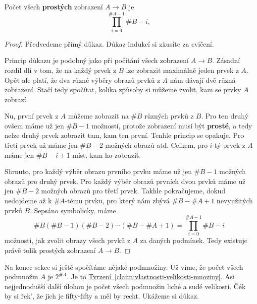 \begin{claim}
 \label{claim:pocet-prostych-zobrazeni}
 Počet všech \textbf{prostých} zobrazení $A \to B$ je
 \[
  \prod_{i=0}^{\# A - 1} \# B - i,
 \]
\end{claim}
\begin{proof}
 Předvedeme přímý důkaz. Důkaz indukcí si zkusíte za cvičení.

 Princip důkazu je podobný jako při počítání všech zobrazení $A \to B$. Zásadní
 rozdíl dlí v tom, že na každý prvek z $B$ lze zobrazit maximálně jeden prvek z
 $A$. Opět ale platí, že dva různé výběry obrazů prvků z $A$ nám dávají dvě
 různá zobrazení. Stačí tedy spočítat, kolika způsoby si můžeme zvolit, kam se
 prvky $A$ zobrazí.

 Nu, první prvek z $A$ můžeme zobrazit na $\# B$ různých prvků z $B$. Pro ten
 druhý ovšem máme už jen $\# B - 1$ možností, protože zobrazení musí být
 \textbf{prosté}, a tedy nelze druhý prvek zobrazit tam, kam ten první. Tenhle
 princip se opakuje. Pro třetí prvek už máme jen $\# B - 2$ možných obrazů atd.
 Celkem, pro $i$-tý prvek z $A$ máme jen $\# B - i + 1$ míst, kam ho zobrazit.

 Shrnuto, pro každý výběr obrazu prvního prvku máme už jen $\# B-1$ možných
 obrazů pro druhý prvek. Pro každý výběr obrazů prvních dvou prvků máme už jen
 $\# B - 2$ možných obrazů pro třetí prvek. Takhle pokračujeme, dokud nedojdeme
 až k $\#A$-tému prvku, pro který nám zbývá $\#B -\# A + 1$ nevyužitých prvků
 $B$. Sepsáno symbolicky, máme
 \[
  \# B (\# B - 1)(\# B - 2)\cdots (\# B - \# A + 1) = \prod_{i=0}^{\# A-1}
  \# B-i 
 \]
 možností, jak zvolit obrazy všech prvků z $A$ za daných podmínek. Tedy existuje
 právě tolik prostých zobrazení $A \to B$.
\end{proof}

Na konec sekce si ještě spočítáme nějaké podmnožiny. Už víme, že počet všech
podmnožin $A$ je $2^{\# A}$. Je to
\hyperref[claim:vlastnosti-velikosti-mnoziny]{Tvrzení~\ref*{claim:vlastnosti-velikosti-mnoziny}}.
Asi nejjednodušší další úlohou je počet všech podmnožin liché a sudé velikosti.
Čék by si řek', že jich je fifty-fifty a měl by recht. Ukážeme si důkaz.

